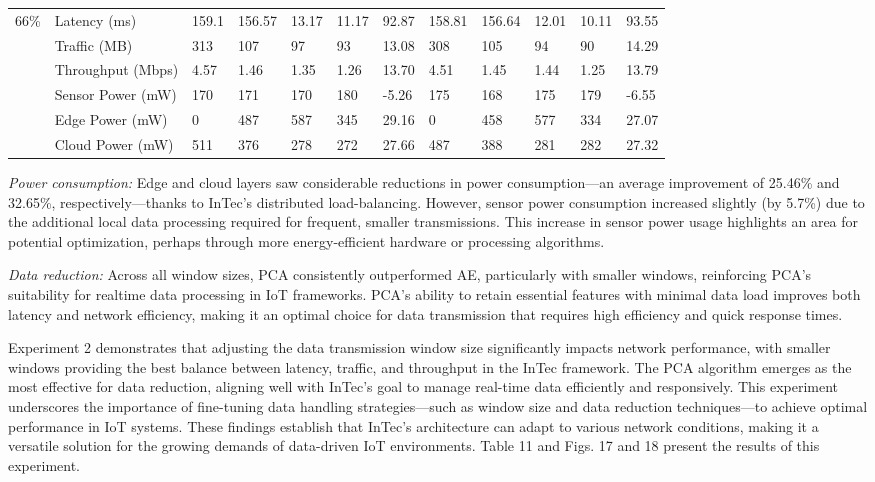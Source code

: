 \documentclass[11pt]{article}
\begin{document}
\begin{landscape}
\begin{table}[t]
{\begin{tabular}{llllllllllll}
					\midrule
					\multirow{6}{*}{66\%} & Latency (ms) & 159.1 & 156.57 & 13.17 & 11.17 & 92.87 & 158.81 & 156.64 & 12.01 & 10.11 & 93.55 \\
					& Traffic (MB) & 313 & 107 & 97 & 93 & 13.08 & 308 & 105 & 94 & 90 & 14.29 \\
					& Throughput (Mbps)  & 4.57 & 1.46 & 1.35 & 1.26 & 13.70 & 4.51 & 1.45 & 1.44 & 1.25 & 13.79 \\
					& Sensor Power (mW) & 170 & 171 & 170 & 180 & -5.26 & 175 & 168 & 175 & 179 & -6.55 \\
					& Edge Power (mW) & 0 & 487 & 587 & 345 & 29.16 & 0 & 458 & 577 & 334 & 27.07 \\
					& Cloud Power (mW) & 511 & 376 & 278 & 272 & 27.66 & 487 & 388 & 281 & 282 & 27.32 \\
					\bottomrule
				\end{tabular}
			}
		\end{table}
	\end{landscape}	
	

	
	\textit{Power consumption:} Edge and cloud layers saw considerable reductions in
	power consumption—an average improvement of 25.46\% and 32.65\%, respectively—thanks to InTec’s distributed load-balancing. However, sensor power consumption increased slightly (by 5.7\%) due to the additional local data processing
	required for frequent, smaller transmissions. This increase in sensor power usage
	highlights an area for potential optimization, perhaps through more energy-efficient hardware or processing algorithms.
	
	\textit{Data reduction:} Across all window sizes, PCA consistently outperformed
	AE, particularly with smaller windows, reinforcing PCA’s suitability for realtime data processing in IoT frameworks. PCA’s ability to retain essential features
	with minimal data load improves both latency and network efficiency, making it
	an optimal choice for data transmission that requires high efficiency and quick
	response times.
	
	Experiment 2 demonstrates that adjusting the data transmission window size
	significantly impacts network performance, with smaller windows providing the best balance between latency, traffic, and throughput in the InTec framework. The
	PCA algorithm emerges as the most effective for data reduction, aligning well with
	InTec’s goal to manage real-time data efficiently and responsively. This experiment
	underscores the importance of fine-tuning data handling strategies—such as window
	size and data reduction techniques—to achieve optimal performance in IoT systems.
	These findings establish that InTec’s architecture can adapt to various network conditions, making it a versatile solution for the growing demands of data-driven IoT
	environments. Table 11 and Figs. 17 and 18 present the results of this experiment.
	
\end{document}
